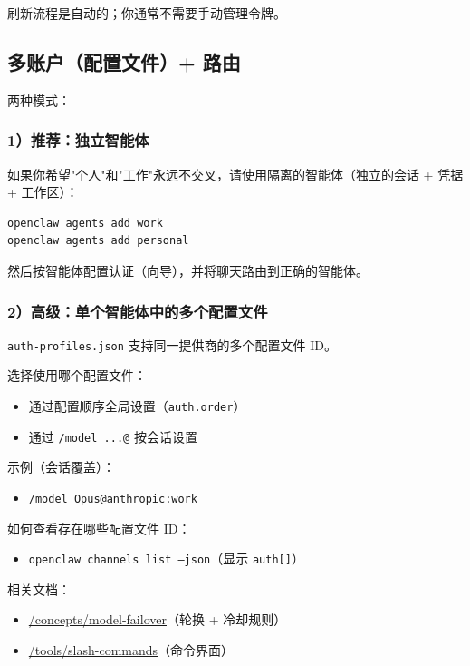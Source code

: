 刷新流程是自动的；你通常不需要手动管理令牌。

\subsection{多账户（配置文件）+ 路由}


两种模式：

\subsubsection{1）推荐：独立智能体}


如果你希望"个人"和"工作"永远不交叉，请使用隔离的智能体（独立的会话 + 凭据 + 工作区）：

\begin{lstlisting}[language=bash]
openclaw agents add work
openclaw agents add personal
\end{lstlisting}


然后按智能体配置认证（向导），并将聊天路由到正确的智能体。

\subsubsection{2）高级：单个智能体中的多个配置文件}


\texttt{auth-profiles.json} 支持同一提供商的多个配置文件 ID。

选择使用哪个配置文件：

\begin{itemize}
  \item 通过配置顺序全局设置（\texttt{auth.order}）
  \item 通过 \texttt{/model ...@} 按会话设置
\end{itemize}


示例（会话覆盖）：

\begin{itemize}
  \item \texttt{/model Opus@anthropic:work}
\end{itemize}


如何查看存在哪些配置文件 ID：

\begin{itemize}
  \item \texttt{openclaw channels list --json}（显示 \texttt{auth[]}）
\end{itemize}


相关文档：

\begin{itemize}
  \item \href{/concepts/model-failover}{/concepts/model-failover}（轮换 + 冷却规则）
  \item \href{/tools/slash-commands}{/tools/slash-commands}（命令界面）
\end{itemize}



